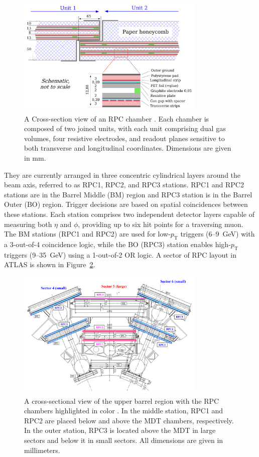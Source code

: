 \begin{figure}[htbp]
  \centering
  \includegraphics[width=0.8\textwidth]{figs/chapter2/RPC_cross_section.png}
  \caption{A Cross-section view of an RPC chamber \cite{ATLASDetector2008}. Each chamber is composed of two joined units, with each unit comprising dual gas volumes, four resistive electrodes, and readout planes sensitive to both transverse and longitudinal coordinates. Dimensions are given in mm.}
  \label{fig:RPC_cross_section}
\end{figure}

They are currently arranged in three concentric cylindrical layers around the beam axis, referred to as RPC1, RPC2, and RPC3 stations. RPC1 and RPC2 stations are in the Barrel Middle (BM) region and RPC3 station is in the Barrel Outer (BO) region. Trigger decisions are based on spatial coincidences between these stations. Each station comprises two independent detector layers capable of measuring both $\eta$ and $\phi$, providing up to six hit points for a traversing muon. The BM stations (RPC1 and RPC2) are used for low-$p_\mathrm{T}$ triggers (6--9~GeV) with a 3-out-of-4 coincidence logic, while the BO (RPC3) station enables high-$p_\mathrm{T}$ triggers (9--35~GeV) using a 1-out-of-2 OR logic. A sector of RPC layout in ATLAS is shown in Figure~\ref{fig:RPC_layout}.

\begin{figure}[htbp]
  \centering
  \includegraphics[width=0.8\textwidth]{figs/chapter2/RPC_layout.png}
  \caption{A cross-sectional view of the upper barrel region with the RPC chambers highlighted in color \cite{ATLASDetector2008}. In the middle station, RPC1 and RPC2 are placed below and above the MDT chambers, respectively. In the outer station, RPC3 is located above the MDT in large sectors and below it in small sectors. All dimensions are given in millimeters.}
  \label{fig:RPC_layout}
\end{figure}

